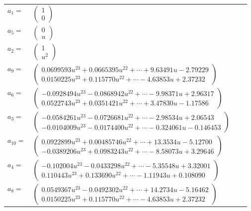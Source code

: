 \documentclass[1p]{elsarticle_modified}
\theoremstyle{definition}
\begin{document}
\begin{tabular}{m{7pt} m{180pt} m{7pt} m{180pt} }
\flushright $a_{1}=$&$\begin{pmatrix}1\\0\end{pmatrix}$ \\
\flushright $a_{5}=$&$\begin{pmatrix}0\\u\end{pmatrix}$ \\
\flushright $a_{2}=$&$\begin{pmatrix}1\\u^2\end{pmatrix}$ \\
\flushright $a_{9}=$&$\begin{pmatrix}0.0699593 u^{23}+0.0665395 u^{22}+\cdots+9.63491 u-2.79229\\0.0150225 u^{23}+0.115770 u^{22}+\cdots-4.63853 u+2.37232\end{pmatrix}$ \\
\flushright $a_{6}=$&$\begin{pmatrix}-0.0928494 u^{23}-0.0868942 u^{22}+\cdots-9.98371 u+2.96317\\0.0522743 u^{23}+0.0351421 u^{22}+\cdots+3.47830 u-1.17586\end{pmatrix}$ \\
\flushright $a_{3}=$&$\begin{pmatrix}-0.0584261 u^{23}-0.0726681 u^{22}+\cdots-2.98534 u+2.06543\\-0.0104009 u^{23}-0.0174400 u^{22}+\cdots-0.324061 u-0.146453\end{pmatrix}$ \\
\flushright $a_{10}=$&$\begin{pmatrix}0.0922899 u^{23}+0.00485746 u^{22}+\cdots+13.3534 u-5.12700\\-0.0389206 u^{23}+0.0983243 u^{22}+\cdots-8.58073 u+3.29646\end{pmatrix}$ \\
\flushright $a_{4}=$&$\begin{pmatrix}-0.102004 u^{23}-0.0433298 u^{22}+\cdots-5.35548 u+3.32001\\0.110443 u^{23}+0.133690 u^{22}+\cdots-1.11943 u+0.108090\end{pmatrix}$ \\
\flushright $a_{8}=$&$\begin{pmatrix}0.0549367 u^{23}-0.0492302 u^{22}+\cdots+14.2734 u-5.16462\\0.0150225 u^{23}+0.115770 u^{22}+\cdots-4.63853 u+2.37232\end{pmatrix}$ \\

\end{tabular}
\end{document}

